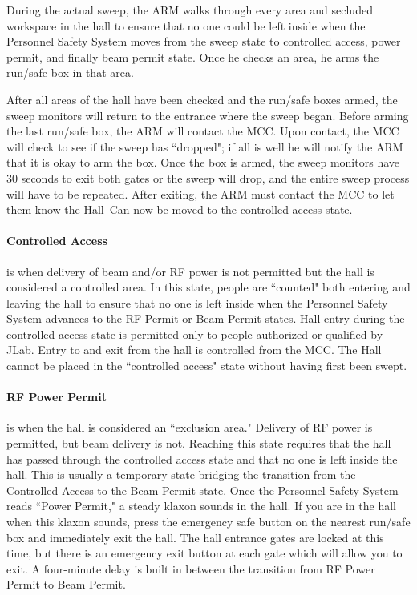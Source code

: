 During the actual sweep, the ARM walks through every area and secluded
workspace in
the hall to ensure that no one could be left inside when the Personnel
Safety System moves
from the sweep state to controlled access, power permit, and finally beam
permit state. Once he
checks an area, he arms the run/safe box in that area.

After all areas of the hall have been checked and the run/safe boxes
armed, the sweep
monitors will return to the entrance where the sweep began. Before arming
the last run/safe box,
the ARM will contact the MCC. Upon contact, the MCC will check to see if
the sweep has
``dropped"; if all is well he will notify the ARM that it is okay to arm the
box. Once the box is
armed, the sweep monitors have 30 seconds to exit both gates or the sweep
will drop, and the
entire sweep process will have to be repeated. After exiting, the ARM must
contact the MCC to
let them know the Hall~Can now be moved to the controlled access state.

\paragraph{Controlled Access} is when delivery of beam and/or RF power is not
permitted but the hall
is considered a controlled area.  In this state, people are ``counted" both
entering and leaving the
hall to ensure that no one is left inside when the Personnel Safety System
advances to the RF
Permit or Beam Permit states.  Hall entry during the controlled access
state is permitted only to
people authorized or qualified by JLab.  Entry to and exit from the hall
is controlled from the
MCC.  The Hall cannot be placed in the ``controlled access" state without
having first been
swept.

\paragraph{RF Power Permit} is when the hall is considered an ``exclusion area."
Delivery of RF
power is permitted,  but beam delivery is not.  Reaching this state
requires that the hall has
passed through the controlled access state and that no one is left inside
the hall. This is usually a
temporary state bridging the transition from the Controlled Access to the
Beam Permit state. Once
the Personnel Safety System reads ``Power Permit," a steady klaxon sounds in
the hall. If you
are in the hall when this klaxon sounds, press the emergency safe button on
the nearest run/safe
box and immediately exit the hall. The hall entrance gates are locked at
this time, but there is an
emergency exit button at each gate which will allow you to exit. A
four-minute delay is built in
between the transition from RF Power Permit to Beam Permit.

